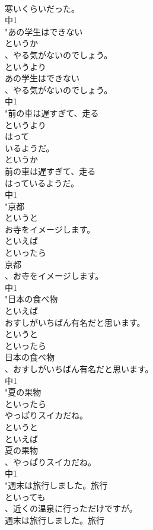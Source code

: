 \documentclass[8pt]{extreport}
\begin{document}
\begin{CJK}{UTF8}{min}
\\	寒いくらいだった。
\\	中1
\\	"あの学生はできない
\\	というか
\\	、やる気がないのでしょう。
\\	というより
\\	あの学生はできない
\\	、やる気がないのでしょう。
\\	中1
\\	"前の車は遅すぎて、走る
\\	というより
\\	はって
\\	いるようだ。
\\	というか
\\	前の車は遅すぎて、走る
\\	はっているようだ。
\\	中1
\\	"京都
\\	というと
\\	お寺をイメージします。
\\	といえば
\\	といったら
\\	京都
\\	、お寺をイメージします。
\\	中1
\\	"日本の食べ物
\\	といえば
\\	おすしがいちばん有名だと思います。
\\	というと
\\	といったら
\\	日本の食べ物
\\	、おすしがいちばん有名だと思います。
\\	中1
\\	"夏の果物
\\	といったら
\\	やっぱりスイカだね。
\\	というと
\\	といえば
\\	夏の果物
\\	、やっぱりスイカだね。
\\	中1
\\	"週末は旅行しました。旅行
\\	といっても
\\	、近くの温泉に行っただけですが。
\\	週末は旅行しました。旅行

\end{CJK}
\end{document}
